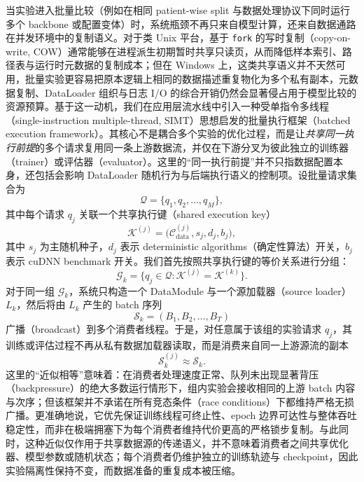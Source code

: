 当实验进入批量比较（例如在相同 patient-wise split 与数据处理协议下同时运行多个 backbone 或配置变体）时，系统瓶颈不再只来自模型计算，还来自数据通路在并发环境中的复制语义。对于类 Unix 平台，基于 \texttt{fork} 的写时复制（copy-on-write, COW）通常能够在进程派生初期暂时共享只读页，从而降低样本索引、路径表与运行时元数据的复制成本；但在 Windows 上，这类共享语义并不天然可用，批量实验更容易把原本逻辑上相同的数据描述重复物化为多个私有副本，元数据复制、DataLoader 组织与日志 I/O 的综合开销仍然会显著侵占用于模型比较的资源预算。基于这一动机，我们在应用层流水线中引入一种受单指令多线程（single-instruction multiple-thread, SIMT）思想启发的批量执行框架（batched execution framework）。其核心不是耦合多个实验的优化过程，而是让\emph{共享同一执行前提}的多个请求复用同一条上游数据流，并仅在下游分叉为彼此独立的训练器（trainer）或评估器（evaluator）。这里的“同一执行前提”并不只指数据配置本身，还包括会影响 DataLoader 随机行为与后端执行语义的控制项。设批量请求集合为
\begin{equation}
    \mathcal{Q} = \{q_1, q_2, \dots, q_M\},
\end{equation}
其中每个请求 $q_j$ 关联一个共享执行键（shared execution key）
\begin{equation}
    \mathcal{K}^{(j)} = \bigl(\mathcal{C}^{(j)}_{\mathrm{data}}, s_j, d_j, b_j \bigr),
\end{equation}
其中 $s_j$ 为主随机种子，$d_j$ 表示 deterministic algorithms（确定性算法）开关，$b_j$ 表示 cuDNN benchmark 开关。我们首先按照共享执行键的等价关系进行分组：
\begin{equation}
    \mathcal{G}_k = \{q_j \in \mathcal{Q} : \mathcal{K}^{(j)} = \mathcal{K}^{(k)}\}.
\end{equation}
对于同一组 $\mathcal{G}_k$，系统只构造一个 DataModule 与一个源加载器（source loader）$L_k$，然后将由 $L_k$ 产生的 batch 序列
\begin{equation}
    \mathcal{S}_k = (B_1, B_2, \dots, B_T)
\end{equation}
广播（broadcast）到多个消费者线程。于是，对任意属于该组的实验请求 $q_j$，其训练或评估过程不再从私有数据加载器读取，而是消费来自同一上游源流的副本
\begin{equation}
    \mathcal{S}_k^{(j)} \approx \mathcal{S}_k.
\end{equation}
这里的“近似相等”意味着：在消费者处理速度正常、队列未出现显著背压（backpressure）的绝大多数运行情形下，组内实验会接收相同的上游 batch 内容与次序；但该框架并不承诺在所有竞态条件（race conditions）下都维持严格无损广播。更准确地说，它优先保证训练线程可终止性、epoch 边界可达性与整体吞吐稳定性，而非在极端拥塞下为每个消费者维持代价更高的严格锁步复制。与此同时，这种近似仅作用于共享数据源的传递语义，并不意味着消费者之间共享优化器、模型参数或随机状态；每个消费者仍维护独立的训练轨迹与 checkpoint，因此实验隔离性保持不变，而数据准备的重复成本被压缩。

